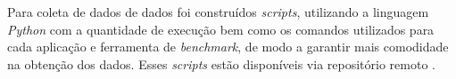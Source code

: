Para coleta de dados de dados foi construídos \textit{scripts}, utilizando a linguagem \textit{Python} \footnotemark[9]                                                                                                                               com a quantidade de execução bem como os comandos utilizados para cada aplicação e ferramenta de \textit{benchmark}, de modo a garantir mais comodidade na obtenção dos dados. Esses \textit{scripts} estão disponíveis via repositório remoto \footnotemark[10].



